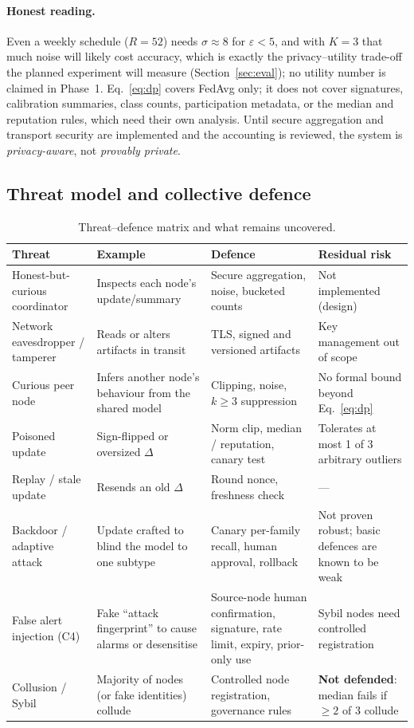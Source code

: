 \documentclass[11pt,a4paper]{article}
\newcommand{\hdr}{\rowcolor{emblue!15}}
\begin{document}
\paragraph{Honest reading.} Even a weekly schedule ($R=52$) needs $\sigma\!\approx\!8$ for $\varepsilon<5$, and with $K=3$ that much noise will likely cost accuracy, which is exactly the privacy--utility trade-off the planned experiment will measure (Section~\ref{sec:eval}); no utility number is claimed in Phase~1. Eq.~\eqref{eq:dp} covers FedAvg only; it does not cover signatures, calibration summaries, class counts, participation metadata, or the median and reputation rules, which need their own analysis. Until secure aggregation and transport security are implemented and the accounting is reviewed, the system is \emph{privacy-aware}, not \emph{provably private}.

\subsection{Threat model and collective defence}

\begin{table}[H]
\centering\small
\caption{Threat--defence matrix and what remains uncovered.}
\label{tab:threats}
\begin{tabularx}{\textwidth}{@{}p{3.1cm} Y Y Y@{}}
\toprule\hdr
Threat & Example & Defence & Residual risk \\
\midrule
Honest-but-curious coordinator & Inspects each node's update/summary & Secure aggregation, noise, bucketed counts & Not implemented (design) \\
Network eavesdropper / tamperer & Reads or alters artifacts in transit & TLS, signed and versioned artifacts & Key management out of scope \\
Curious peer node & Infers another node's behaviour from the shared model & Clipping, noise, $k\!\ge\!3$ suppression & No formal bound beyond Eq.~\eqref{eq:dp} \\
Poisoned update & Sign-flipped or oversized $\Delta$ & Norm clip, median / reputation, canary test & Tolerates at most 1 of 3 arbitrary outliers \\
Replay / stale update & Resends an old $\Delta$ & Round nonce, freshness check & --- \\
Backdoor / adaptive attack & Update crafted to blind the model to one subtype~\cite{bagdasaryan2020} & Canary per-family recall, human approval, rollback & Not proven robust; basic defences are known to be weak \\
False alert injection (C4) & Fake ``attack fingerprint'' to cause alarms or desensitise & Source-node human confirmation, signature, rate limit, expiry, prior-only use & Sybil nodes need controlled registration \\
Collusion / Sybil & Majority of nodes (or fake identities) collude & Controlled node registration, governance rules & \textbf{Not defended}: median fails if $\ge2$ of 3 collude \\
\bottomrule
\end{tabularx}
\end{table}
\end{document}
